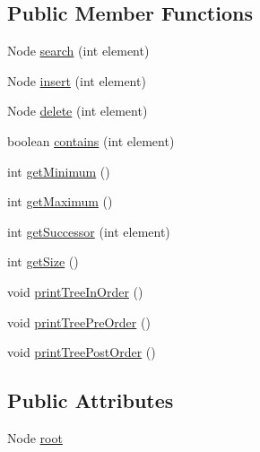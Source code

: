 \subsection*{Public Member Functions}
\begin{DoxyCompactItemize}
\item 
Node \hyperlink{classcom_1_1rutgers_1_1Tree_1_1AbstractBinarySearchTree_a91602e347d8f02a67319b1bdc02ce60f}{search} (int element)
\item 
Node \hyperlink{classcom_1_1rutgers_1_1Tree_1_1AbstractBinarySearchTree_a0c7ca514dacdeb9085d258af23a7795e}{insert} (int element)
\item 
Node \hyperlink{classcom_1_1rutgers_1_1Tree_1_1AbstractBinarySearchTree_ae4be00a93f577025f71dd9560c11794b}{delete} (int element)
\item 
boolean \hyperlink{classcom_1_1rutgers_1_1Tree_1_1AbstractBinarySearchTree_a3fa83547331d30e71ef6906cfc67d686}{contains} (int element)
\item 
int \hyperlink{classcom_1_1rutgers_1_1Tree_1_1AbstractBinarySearchTree_a381c986a1e005fb07a5fb79d90218d79}{get\+Minimum} ()
\item 
int \hyperlink{classcom_1_1rutgers_1_1Tree_1_1AbstractBinarySearchTree_a19fac32887573d0c421ef6f191b694d1}{get\+Maximum} ()
\item 
int \hyperlink{classcom_1_1rutgers_1_1Tree_1_1AbstractBinarySearchTree_a91f7a4935262e9fd21035f3c795acbe1}{get\+Successor} (int element)
\item 
int \hyperlink{classcom_1_1rutgers_1_1Tree_1_1AbstractBinarySearchTree_a0d8f3f8b88ef6f741c0a0308f4ed0617}{get\+Size} ()
\item 
void \hyperlink{classcom_1_1rutgers_1_1Tree_1_1AbstractBinarySearchTree_a8757f96dff7c12848301f666fe2cc566}{print\+Tree\+In\+Order} ()
\item 
void \hyperlink{classcom_1_1rutgers_1_1Tree_1_1AbstractBinarySearchTree_a53e70e7883a86f60584f4585c07900ff}{print\+Tree\+Pre\+Order} ()
\item 
void \hyperlink{classcom_1_1rutgers_1_1Tree_1_1AbstractBinarySearchTree_a8efda65ce2fb4df01a22b7168882843a}{print\+Tree\+Post\+Order} ()
\end{DoxyCompactItemize}
\subsection*{Public Attributes}
\begin{DoxyCompactItemize}
\item 
Node \hyperlink{classcom_1_1rutgers_1_1Tree_1_1AbstractBinarySearchTree_aeeef22ff6ee25b6d8b9ceac2f17e8fe5}{root}
\end{DoxyCompactItemize}
